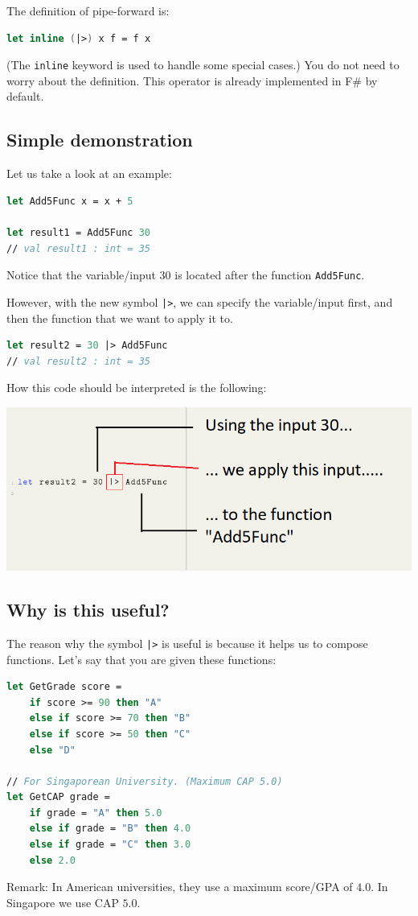 \documentclass[12pt]{article}
\begin{document}
The definition of pipe-forward is:
\begin{lstlisting}[language=FSharp]
let inline (|>) x f = f x
\end{lstlisting}
(The \texttt{inline} keyword is used to handle some special cases.) You do not need to worry about the definition. This operator is already implemented in F\# by default.

\subsection{Simple demonstration}
Let us take a look at an example:
\begin{lstlisting}[language=FSharp]
let Add5Func x = x + 5

let result1 = Add5Func 30
// val result1 : int = 35
\end{lstlisting}
Notice that the variable/input $30$ is located after the function \texttt{Add5Func}. 

However, with the new symbol \texttt{|>}, we can specify the variable/input first, and then the function that we want to apply it to.
\begin{lstlisting}[language=FSharp]
let result2 = 30 |> Add5Func
// val result2 : int = 35
\end{lstlisting}
How this code should be interpreted is the following:
\begin{center}
\includegraphics[width=16cm]{pictures/picture21.png}
\end{center}
\subsection{Why is this useful?}
The reason why the symbol \texttt{|>} is useful is because it helps us to compose functions. Let's say that you are given these functions:
\begin{lstlisting}[language=FSharp]
let GetGrade score =
    if score >= 90 then "A"
    else if score >= 70 then "B"
    else if score >= 50 then "C"
    else "D"

// For Singaporean University. (Maximum CAP 5.0)
let GetCAP grade =
    if grade = "A" then 5.0
    else if grade = "B" then 4.0
    else if grade = "C" then 3.0
    else 2.0
\end{lstlisting}
Remark: In American universities, they use a maximum score/GPA of $4.0$. In Singapore we use CAP  $5.0$.
\end{document}
